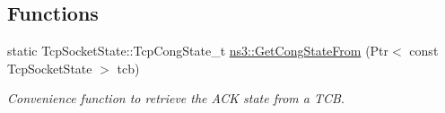 \subsection*{Functions}
\begin{DoxyCompactItemize}
\item 
static Tcp\+Socket\+State\+::\+Tcp\+Cong\+State\+\_\+t \hyperlink{group__internet-test_ga754ba534fba0aeb1e923326d7c49a7d3}{ns3\+::\+Get\+Cong\+State\+From} (Ptr$<$ const Tcp\+Socket\+State $>$ tcb)
\begin{DoxyCompactList}\small\item\em Convenience function to retrieve the A\+CK state from a T\+CB. \end{DoxyCompactList}\end{DoxyCompactItemize}
